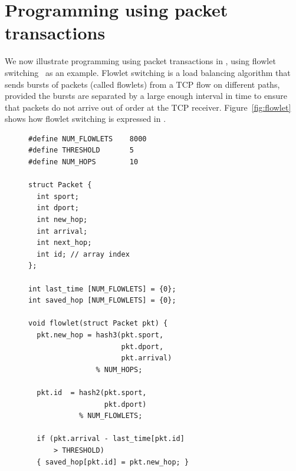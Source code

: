 \section{Programming using packet transactions}
\label{s:transactions}

We now illustrate programming using packet transactions in \pktlanguage,
using flowlet
switching~\cite{flowlets} as an example. Flowlet switching is a load
balancing algorithm that sends bursts of packets (called flowlets)
from a TCP flow on different paths, provided the bursts are separated
by a large enough interval in time to ensure that packets do not
arrive out of order at the TCP receiver. Figure~\ref{fig:flowlet}
shows how flowlet switching is expressed in \pktlanguage.

\begin{figure}[!t]
\begin{minipage}{0.6\textwidth}
\begin{small}
\begin{lstlisting}[style=customc]
#define NUM_FLOWLETS    8000
#define THRESHOLD       5
#define NUM_HOPS        10

struct Packet {
  int sport;
  int dport;
  int new_hop;
  int arrival;
  int next_hop;
  int id; // array index
};

int last_time [NUM_FLOWLETS] = {0};
int saved_hop [NUM_FLOWLETS] = {0};

void flowlet(struct Packet pkt) {
  pkt.new_hop = hash3(pkt.sport,
                      pkt.dport,
                      pkt.arrival)
                % NUM_HOPS;

  pkt.id  = hash2(pkt.sport,
                  pkt.dport)
            % NUM_FLOWLETS;

  if (pkt.arrival - last_time[pkt.id] 
      > THRESHOLD) 
  { saved_hop[pkt.id] = pkt.new_hop; }


\end{lstlisting}
\end{small}
\end{minipage}
\end{figure}
